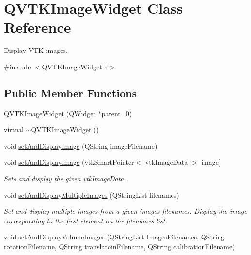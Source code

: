 \hypertarget{class_q_v_t_k_image_widget}{\section{Q\-V\-T\-K\-Image\-Widget Class Reference}
\label{d8/dd7/class_q_v_t_k_image_widget}
}


Display V\-T\-K images.  




{\ttfamily \#include $<$Q\-V\-T\-K\-Image\-Widget.\-h$>$}

\subsection*{Public Member Functions}
\begin{DoxyCompactItemize}
\item 
\hyperlink{class_q_v_t_k_image_widget_ab32cec8874449b586d7fbf6eac7e6b8d}{Q\-V\-T\-K\-Image\-Widget} (Q\-Widget $\ast$parent=0)
\item 
virtual \hyperlink{class_q_v_t_k_image_widget_a60ba9a3e24a288e7a73cfca5caaf7393}{$\sim$\-Q\-V\-T\-K\-Image\-Widget} ()
\item 
void \hyperlink{class_q_v_t_k_image_widget_a99ccfbda431140e785a672432b500743}{set\-And\-Display\-Image} (Q\-String image\-Filename)
\item 
void \hyperlink{class_q_v_t_k_image_widget_aebaa775058eebd750adbdb7c70fdd90a}{set\-And\-Display\-Image} (vtk\-Smart\-Pointer$<$ vtk\-Image\-Data $>$ image)
\begin{DoxyCompactList}\small\item\em Sets and display the given vtk\-Image\-Data. \end{DoxyCompactList}\item 
void \hyperlink{class_q_v_t_k_image_widget_acd43450864ef2c0cdd7b8d37f045d8fd}{set\-And\-Display\-Multiple\-Images} (Q\-String\-List filenames)
\begin{DoxyCompactList}\small\item\em Set and display multiple images from a given images filenames. Display the image corresponding to the first element on the filenmaes list. \end{DoxyCompactList}\item 
void \hyperlink{class_q_v_t_k_image_widget_ad605fe552c806d21e6729b66f648600a}{set\-And\-Display\-Volume\-Images} (Q\-String\-List Images\-Filenames, Q\-String rotation\-Filename, Q\-String translatoin\-Filename, Q\-String calibration\-Filename)

\end{DoxyCompactItemize}
